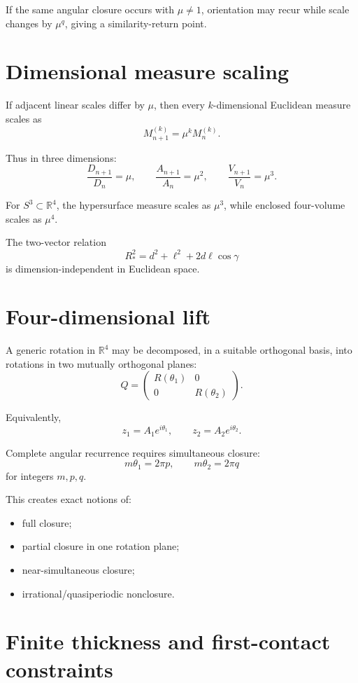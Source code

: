 \documentclass[11pt]{article}
\newcommand{\R}{\mathbb{R}}
\begin{document}
If the same angular closure occurs with $\mu\neq1$, orientation may recur while
scale changes by $\mu^q$, giving a similarity-return point.

\section{Dimensional measure scaling}

If adjacent linear scales differ by $\mu$, then every $k$-dimensional Euclidean
measure scales as
\[
M^{(k)}_{n+1}=\mu^k M^{(k)}_n.
\]

Thus in three dimensions:
\[
\frac{D_{n+1}}{D_n}=\mu,
\qquad
\frac{A_{n+1}}{A_n}=\mu^2,
\qquad
\frac{V_{n+1}}{V_n}=\mu^3.
\]

For $S^3\subset\R^4$, the hypersurface measure scales as $\mu^3$, while enclosed
four-volume scales as $\mu^4$.

The two-vector relation
\[
R_*^2=d^2+\ell^2+2d\ell\cos\gamma
\]
is dimension-independent in Euclidean space.

\section{Four-dimensional lift}

A generic rotation in $\R^4$ may be decomposed, in a suitable orthogonal basis,
into rotations in two mutually orthogonal planes:
\[
Q
=
\begin{pmatrix}
R(\theta_1)&0\\
0&R(\theta_2)
\end{pmatrix}.
\]

Equivalently,
\[
z_1=A_1e^{i\theta_1},
\qquad
z_2=A_2e^{i\theta_2}.
\]

Complete angular recurrence requires simultaneous closure:
\[
m\theta_1=2\pi p,
\qquad
m\theta_2=2\pi q
\]
for integers $m,p,q$.

This creates exact notions of:
\begin{itemize}
    \item full closure;
    \item partial closure in one rotation plane;
    \item near-simultaneous closure;
    \item irrational/quasiperiodic nonclosure.
\end{itemize}

\section{Finite thickness and first-contact constraints}
\end{document}
